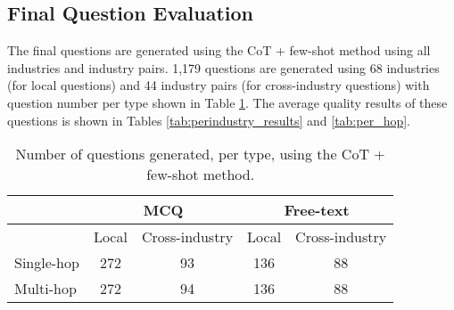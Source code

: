 \subsection{Final Question Evaluation}


The final questions are generated using the CoT + few-shot method using all industries and industry pairs. 1,179 questions are generated using 68 industries (for local questions) and 44 industry pairs (for cross-industry questions) with question number per type shown in Table \ref{tab:final_qa_numbers}. The average quality results of these questions is shown in Tables \ref{tab:perindustry_results} and \ref{tab:per_hop}.

\begin{table}[H]
\centering
\begin{tabular}{lcccc}
\hline
           & \multicolumn{2}{c}{MCQ}                               & \multicolumn{2}{c}{Free-text}                         \\ \hline
           & \multicolumn{1}{l}{Local} & \multicolumn{1}{l}{Cross-industry} & \multicolumn{1}{l}{Local} & \multicolumn{1}{l}{Cross-industry} \\ \cline{2-5} 
Single-hop & 272                       & 93                        & 136                       & 88                        \\
Multi-hop  & 272                       & 94                        & 136                       & 88                        \\ \hline
\end{tabular}
\caption{Number of questions generated, per type, using the CoT + few-shot method.}
\label{tab:final_qa_numbers}
\end{table}


